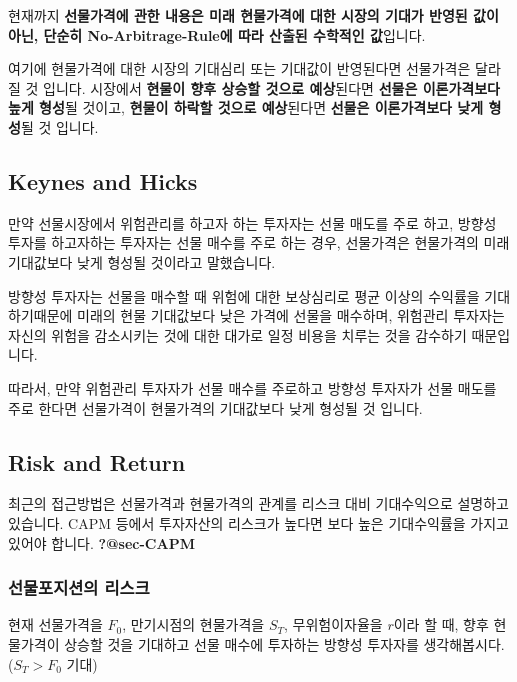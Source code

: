 \documentclass[
  letterpaper,
  DIV=11,
  numbers=noendperiod]{scrreprt}
\begin{document}

현재까지 \textbf{선물가격에 관한 내용은 미래 현물가격에 대한 시장의
기대가 반영된 값이 아닌, 단순히 No-Arbitrage-Rule에 따라 산출된 수학적인
값}입니다.

여기에 현물가격에 대한 시장의 기대심리 또는 기대값이 반영된다면
선물가격은 달라질 것 입니다. 시장에서 \textbf{현물이 향후 상승할 것으로
예상}된다면 \textbf{선물은 이론가격보다 높게 형성}될 것이고,
\textbf{현물이 하락할 것으로 예상}된다면 \textbf{선물은 이론가격보다
낮게 형성}될 것 입니다.

\subsection*{Keynes and Hicks}\label{keynes-and-hicks}

만약 선물시장에서 위험관리를 하고자 하는 투자자는 선물 매도를 주로 하고,
방향성 투자를 하고자하는 투자자는 선물 매수를 주로 하는 경우, 선물가격은
현물가격의 미래 기대값보다 낮게 형성될 것이라고 말했습니다.

방향성 투자자는 선물을 매수할 때 위험에 대한 보상심리로 평균 이상의
수익률을 기대하기때문에 미래의 현물 기대값보다 낮은 가격에 선물을
매수하며, 위험관리 투자자는 자신의 위험을 감소시키는 것에 대한 대가로
일정 비용을 치루는 것을 감수하기 때문입니다.

따라서, 만약 위험관리 투자자가 선물 매수를 주로하고 방향성 투자자가 선물
매도를 주로 한다면 선물가격이 현물가격의 기대값보다 낮게 형성될 것
입니다.

\subsection*{Risk and Return}\label{risk-and-return}

최근의 접근방법은 선물가격과 현물가격의 관계를 리스크 대비 기대수익으로
설명하고 있습니다. CAPM 등에서 투자자산의 리스크가 높다면 보다 높은
기대수익률을 가지고 있어야 합니다. \textbf{?@sec-CAPM}

\subsubsection*{선물포지션의
리스크}\label{uxc120uxbb3cuxd3ecuxc9c0uxc158uxc758-uxb9acuxc2a4uxd06c}

현재 선물가격을 \(F_0\), 만기시점의 현물가격을 \(S_T\), 무위험이자율을
\(r\)이라 할 때, 향후 현물가격이 상승할 것을 기대하고 선물 매수에
투자하는 방향성 투자자를 생각해봅시다. (\(S_T>F_0\) 기대)
\end{document}
